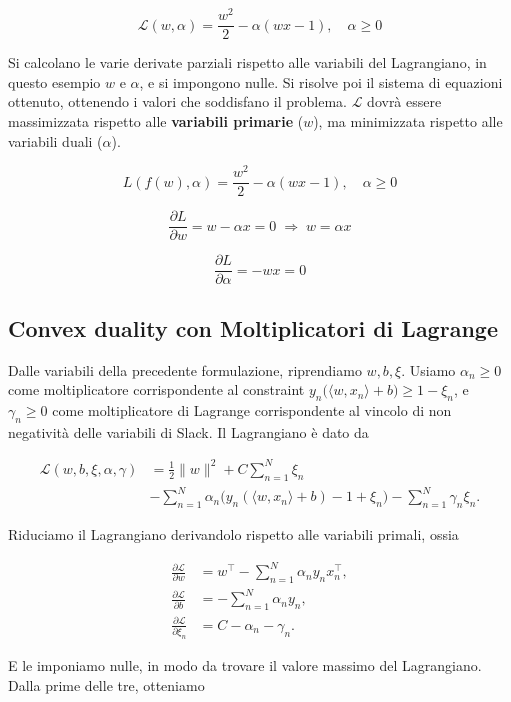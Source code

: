 $$
\mathcal{L}(w,\alpha) = \frac{w^2}{2} - \alpha(wx-1), \quad \alpha \geq 0
$$

Si calcolano le varie derivate parziali rispetto alle variabili del Lagrangiano, in questo esempio $w$ e $\alpha$, e si impongono nulle. Si risolve poi il sistema di equazioni ottenuto, ottenendo i valori che soddisfano il problema. $\mathcal{L}$ dovrà essere massimizzata rispetto alle \textbf{variabili primarie} ($w$), ma minimizzata rispetto alle variabili duali ($\alpha$).

$$
L(f(w),\alpha) = \frac{w^{2}}{2} - \alpha(wx - 1), \quad \alpha \ge 0
$$

$$
\frac{\partial L}{\partial w} = w - \alpha x = 0 \;\Rightarrow\; w = \alpha x
$$

$$
\frac{\partial L}{\partial \alpha} = -wx = 0
$$


\subsection{Convex duality con Moltiplicatori di Lagrange}
Dalle variabili della precedente formulazione, riprendiamo $w, b, \xi$. Usiamo $\alpha_n \geq 0$ come moltiplicatore corrispondente al constraint $y_n \big( \langle w, x_n \rangle + b \big) \ge 1 - \xi_n$, e $\gamma_n \geq 0$ come moltiplicatore di Lagrange corrispondente al vincolo di non negatività delle variabili di Slack. Il Lagrangiano è dato da

$$
\begin{aligned}
\mathcal{L}(w,b,\xi,\alpha,\gamma)
&= \frac{1}{2}\|w\|^{2} + C \sum_{n=1}^{N} \xi_n\\
&- \sum_{n=1}^{N} \alpha_n \big( y_n (\langle w, x_n \rangle + b) - 1 + \xi_n \big)
- \sum_{n=1}^{N} \gamma_n \xi_n .
\end{aligned}
$$

\noindent
Riduciamo il Lagrangiano derivandolo rispetto alle variabili primali, ossia

$$
\begin{aligned}
	\frac{\partial \mathcal{L}}{\partial w}
	&= w^{\top} - \sum_{n=1}^{N} \alpha_n y_n x_n^{\top}, \\
	\frac{\partial \mathcal{L}}{\partial b}
	&= - \sum_{n=1}^{N} \alpha_n y_n , \\
	\frac{\partial \mathcal{L}}{\partial \xi_n}
	&= C - \alpha_n - \gamma_n .
\end{aligned}
$$

E le imponiamo nulle, in modo da trovare il valore massimo del Lagrangiano. Dalla prime delle tre, otteniamo

